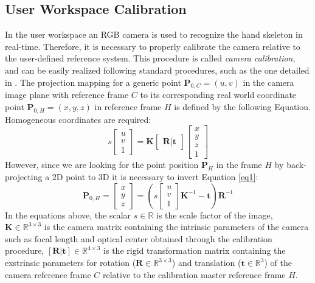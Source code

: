 \documentclass[letterpaper, 10 pt, conference]{ieeeconf}  %
\begin{document}
\subsection{User Workspace Calibration}
In the user workspace an RGB camera is used to recognize the hand skeleton in real-time. Therefore, it is necessary to properly calibrate the camera relative to the user-defined reference system. This procedure is called \textit{camera calibration}, and can be easily realized following standard procedures, such as the one detailed in \cite{MatlabCameraCalib}.
The projection mapping for a generic point $\mathbf{P}_{0,C} = (u,v)$ in the camera image plane with reference frame $C$ to its corresponding real world coordinate point $\mathbf{P}_{0,H} = (x,y,z)$ in reference frame $H$ is defined by the following Equation. Homogeneous coordinates are required:
\begin{equation}
s 
  \begin{bmatrix}
    u \\
    v \\
    1
  \end{bmatrix}
 =
\mathbf{K}
  \begin{bmatrix}
    \mathbf{R} | \mathbf{t}
  \end{bmatrix}
  \begin{bmatrix}
    x \\
    y \\
    z \\
    1
  \end{bmatrix}
\label{eq1}
\end{equation}
However, since we are looking for the point position $\mathbf{P}_H$ in the frame $H$ by back-projecting a 2D point to 3D it is necessary to invert Equation \ref{eq1}:
\begin{equation}
\mathbf{P}_{0,H} = \begin{bmatrix}
x \\
y \\
z
\end{bmatrix}=
\left(s 
\begin{bmatrix}
u \\
v \\
1
\end{bmatrix}
\mathbf{K}^{-1}-\mathbf{t}\right)\mathbf{R}^{-1}
\label{eq2}
\end{equation}
In the equations above, the scalar $s\in\mathbb{R}$ is the scale factor of the image, $\mathbf{K}\in\mathbb{R}^{3\times3}$ is the camera matrix containing the intrinsic parameters of the camera such as focal length and optical center obtained through the calibration procedure, $\mathbf{[R|t]}\in\mathbb{R}^{4\times3}$ is the rigid transformation matrix containing the exstrinsic parameters for rotation ($\mathbf{R}\in\mathbb{R}^{3\times3}$) and translation ($\mathbf{t}\in\mathbb{R}^3$) of the camera reference frame $C$ relative to the calibration master reference frame $H$. 
\end{document}
